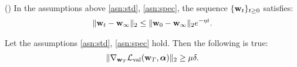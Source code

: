 
\begin{lemma}(\cite{shaban2019truncated})\label{lemma:conv}
In the assumptions above \ref{asn:std}, \ref{asn:spec}, the sequence $\{\boldsymbol{\mathbf{w}}_t\}_{t \geq 0}$ satisfies:
\begin{align}\label{eq:lemma_conv}
    \|\boldsymbol{\mathbf{w}}_t - \boldsymbol{\mathbf{w}}_\infty\|_2 \leq \|\boldsymbol{\mathbf{w}}_0 - \boldsymbol{\mathbf{w}}_\infty\|_2e^{-\eta t}.
\end{align}

\end{lemma}

\begin{lemma}\label{lamma:bound_grad}
    Let the assumptions \ref{asn:std}, \ref{asn:spec} hold. Then the following is true:
    \begin{align}
        \|\nabla_{\boldsymbol{\mathbf{w}}_T}\mathcal{L}_{\mathrm{val}}(\boldsymbol{\mathbf{w}}_T, \boldsymbol{\mathbf{\alpha}})\|_2 \geq \mu\delta.
    \end{align}
\end{lemma}

